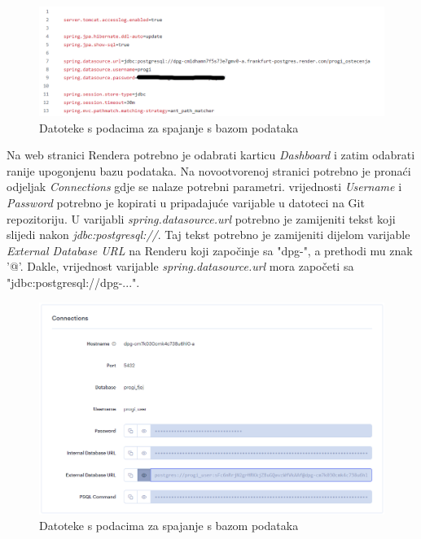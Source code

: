 			\begin{figure}[H]
				\includegraphics[width=\textwidth]{slike/upute/applicationProperties.png} %
				\caption{Datoteke s podacima za spajanje s bazom podataka}
				\label{fig:applicationProperties} %
			\end{figure}
			
			Na web stranici Rendera potrebno je odabrati karticu \textit{Dashboard} i zatim odabrati ranije upogonjenu bazu podataka. Na novootvorenoj stranici potrebno je pronaći odjeljak \textit{Connections} gdje se nalaze potrebni parametri. vrijednosti \textit{Username} i \textit{Password} potrebno je kopirati u pripadajuće varijable u datoteci na Git repozitoriju. U varijabli \textit{spring.datasource.url} potrebno je zamijeniti tekst koji slijedi nakon \textit{jdbc:postgresql://}. Taj tekst potrebno je zamijeniti dijelom varijable \textit{External Database URL} na Renderu koji započinje sa "dpg-", a prethodi mu znak '@'. Dakle, vrijednost varijable \textit{spring.datasource.url} mora započeti sa "jdbc:postgresql://dpg-...".
			
			\begin{figure}[H]
				\includegraphics[width=\textwidth]{slike/upute/parametriBaze.png} %
				\caption{Datoteke s podacima za spajanje s bazom podataka}
				\label{fig:parametriBaze} %
			\end{figure}
			
